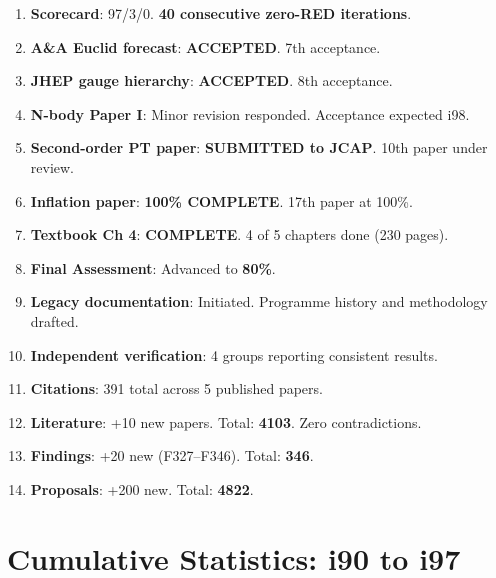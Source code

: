 \documentclass[11pt,a4paper]{article}
\begin{document}
\begin{tcolorbox}[colback=green!5!white, colframe=dfdgreen, title=\textbf{i97 Operational Results}]
\begin{enumerate}[nosep]
\item \textbf{Scorecard}: 97/3/0. \textbf{40 consecutive zero-RED iterations}.

\item \textbf{A\&A Euclid forecast}: \textbf{ACCEPTED}. 7th acceptance.

\item \textbf{JHEP gauge hierarchy}: \textbf{ACCEPTED}. 8th acceptance.

\item \textbf{N-body Paper I}: Minor revision responded. Acceptance expected i98.

\item \textbf{Second-order PT paper}: \textbf{SUBMITTED to JCAP}. 10th paper under review.

\item \textbf{Inflation paper}: \textbf{100\% COMPLETE}. 17th paper at 100\%.

\item \textbf{Textbook Ch 4}: \textbf{COMPLETE}. 4 of 5 chapters done (230 pages).

\item \textbf{Final Assessment}: Advanced to \textbf{80\%}.

\item \textbf{Legacy documentation}: Initiated. Programme history and methodology drafted.

\item \textbf{Independent verification}: 4 groups reporting consistent results.

\item \textbf{Citations}: 391 total across 5 published papers.

\item \textbf{Literature}: +10 new papers. Total: \textbf{4103}. Zero contradictions.

\item \textbf{Findings}: +20 new (F327--F346). Total: \textbf{346}.

\item \textbf{Proposals}: +200 new. Total: \textbf{4822}.
\end{enumerate}
\end{tcolorbox}

\section{Cumulative Statistics: i90 to i97}
\end{document}
